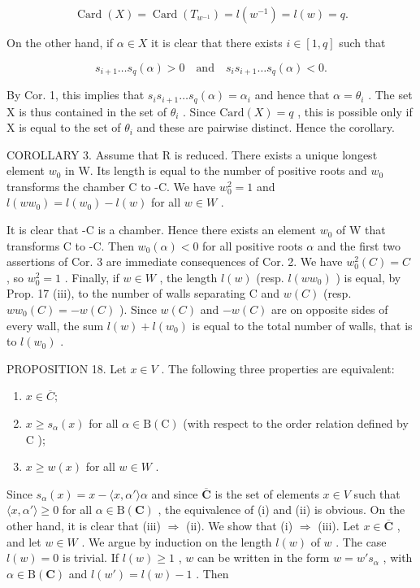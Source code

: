 \[
\operatorname{Card} (X) = \operatorname{Card} \left(T _ {w ^ {- 1}}\right) = l \left(w ^ {- 1}\right) = l (w) = q.
\]

On the other hand, if \(\alpha \in X\) it is clear that there exists \(i \in [1, q]\) such that

\[
s _ {i + 1} \ldots s _ {q} (\alpha) > 0 \quad \text {and} \quad s _ {i} s _ {i + 1} \ldots s _ {q} (\alpha) <   0.
\]

By Cor. 1, this implies that \(s_i s_{i+1} \ldots s_q(\alpha) = \alpha_i\) and hence that \(\alpha = \theta_i\) . The set X is thus contained in the set of \(\theta_i\) . Since \(\text{Card}(X) = q\) , this is possible only if X is equal to the set of \(\theta_i\) and these are pairwise distinct. Hence the corollary.

COROLLARY 3. Assume that R is reduced. There exists a unique longest element \(w_0\) in W. Its length is equal to the number of positive roots and \(w_0\) transforms the chamber C to -C. We have \(w_0^2 = 1\) and \(l(ww_0) = l(w_0) - l(w)\) for all \(w \in W\) .

It is clear that -C is a chamber. Hence there exists an element \(w_{0}\) of W that transforms C to -C. Then \(w_{0}(\alpha) < 0\) for all positive roots \(\alpha\) and the first two assertions of Cor. 3 are immediate consequences of Cor. 2. We have \(w_{0}^{2}(C) = C\) , so \(w_{0}^{2} = 1\) . Finally, if \(w \in W\) , the length \(l(w)\) (resp. \(l(ww_{0})\) ) is equal, by Prop. 17 (iii), to the number of walls separating C and \(w(C)\) (resp. \(ww_{0}(C) = -w(C)\) ). Since \(w(C)\) and \(-w(C)\) are on opposite sides of every wall, the sum \(l(w) + l(w_{0})\) is equal to the total number of walls, that is to \(l(w_{0})\) .

PROPOSITION 18. Let \(x \in V\) . The following three properties are equivalent:

\begin{enumerate}
\def\labelenumi{(\roman{enumi})}
\item
  \(x \in \overline{C};\)
\item
  \(x \geqslant s_{\alpha}(x)\) for all \(\alpha \in \mathrm{B}(\mathrm{C})\) (with respect to the order relation defined by \(\mathrm{C}\) );
\item
  \(x \geqslant w(x)\) for all \(w \in W\) .
\end{enumerate}

Since \(s_{\alpha}(x) = x - \langle x, \alpha' \rangle \alpha\) and since \(\overline{\mathbf{C}}\) is the set of elements \(x \in V\) such that \(\langle x, \alpha' \rangle \geqslant 0\) for all \(\alpha \in \mathrm{B}(\mathbf{C})\) , the equivalence of (i) and (ii) is obvious. On the other hand, it is clear that (iii) \(\Longrightarrow\) (ii). We show that (i) \(\Longrightarrow\) (iii). Let \(x \in \overline{\mathbf{C}}\) , and let \(w \in W\) . We argue by induction on the length \(l(w)\) of \(w\) . The case \(l(w) = 0\) is trivial. If \(l(w) \geqslant 1\) , \(w\) can be written in the form \(w = w's_{\alpha}\) , with \(\alpha \in \mathrm{B}(\mathbf{C})\) and \(l(w') = l(w) - 1\) . Then


